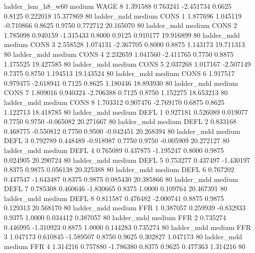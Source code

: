      ladder_lsm_h8_w60     medium     WAGE                 8  1.391588 0.763241 -2.451734 0.6625 0.8125  0.222018   15.377869 80
            ladder_mdd     medium     CONS                 1  1.877696 1.045119 -0.710866 0.8625 0.9750  0.772712   20.165070 80
            ladder_mdd     medium     CONS                 2  1.785098 0.940159 -1.315433 0.8000 0.9125  0.910177   19.916899 80
            ladder_mdd     medium     CONS                 3  2.558528 1.074131 -2.367705 0.8000 0.8875  1.143173   19.711313 80
            ladder_mdd     medium     CONS                 4  2.232659 1.041560 -2.411765 0.7750 0.8875  1.175525   19.427585 80
            ladder_mdd     medium     CONS                 5  2.037268 1.017167 -2.507149 0.7375 0.8750  1.194513   19.143524 80
            ladder_mdd     medium     CONS                 6  1.917517 0.979475 -2.618941 0.7125 0.8625  1.180446   18.893930 80
            ladder_mdd     medium     CONS                 7  1.809016 0.940324 -2.706388 0.7125 0.8750  1.152275   18.653213 80
            ladder_mdd     medium     CONS                 8  1.703312 0.907476 -2.769170 0.6875 0.8625  1.122713   18.418785 80
            ladder_mdd     medium     DEFL                 1  0.927181 0.526089  0.019077 0.7750 0.9750 -0.065082   20.271667 80
            ladder_mdd     medium     DEFL                 2  0.833168 0.468775 -0.550812 0.7750 0.9500 -0.042451   20.268394 80
            ladder_mdd     medium     DEFL                 3  0.792789 0.448489 -0.918987 0.7750 0.9750 -0.005909   20.272127 80
            ladder_mdd     medium     DEFL                 4  0.765089 0.437875 -1.195247 0.8000 0.9875  0.024905   20.290724 80
            ladder_mdd     medium     DEFL                 5  0.753277 0.437497 -1.430197 0.8375 0.9875  0.056138   20.325388 80
            ladder_mdd     medium     DEFL                 6  0.767202 0.447547 -1.643487 0.8375 0.9875  0.085430   20.385866 80
            ladder_mdd     medium     DEFL                 7  0.785308 0.460646 -1.830665 0.8375 1.0000  0.109764   20.467391 80
            ladder_mdd     medium     DEFL                 8  0.811587 0.476482 -2.000741 0.8875 0.9875  0.129313   20.568170 80
            ladder_mdd     medium      FFR                 1  0.387057 0.259939 -0.832933 0.9375 1.0000  0.034412    0.387057 80
            ladder_mdd     medium      FFR                 2  0.735274 0.446995 -1.310923 0.8875 1.0000  0.144283    0.735274 80
            ladder_mdd     medium      FFR                 3  1.047173 0.610845 -1.589507 0.8750 0.9625  0.302827    1.047173 80
            ladder_mdd     medium      FFR                 4  1.314216 0.757880 -1.786380 0.8375 0.9625  0.477363    1.314216 80
